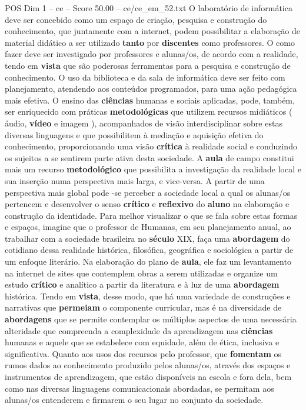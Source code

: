\begin{textsample}{POS Dim 1 – ce – Score 50.00 – ce/ce\_em\_52.txt}
O laboratório de informática deve ser concebido como um espaço de criação, pesquisa e construção do conhecimento, que juntamente com a internet, podem possibilitar a elaboração de material didático a ser utilizado \textbf{tanto} por \textbf{discentes} como professores.
O como fazer deve ser investigado por professores e alunas/os, de acordo com a realidade, tendo em \textbf{vista} que são poderosas ferramentas para a pesquisa e construção de conhecimento.
O uso da biblioteca e da sala de informática deve ser feito com planejamento, atendendo aos conteúdos programados, para uma ação pedagógica mais efetiva.
O ensino das \textbf{ciências} humanas e sociais aplicadas, pode, também, ser enriquecido com práticas \textbf{metodológicas} que utilizem recursos midiáticos ( áudio, \textbf{vídeo} e imagem ), acompanhados de visão interdisciplinar sobre estas diversas linguagens e que possibilitem à mediação e aquisição efetiva do conhecimento, proporcionando uma visão \textbf{crítica} à realidade social e conduzindo os sujeitos a se sentirem parte ativa desta sociedade.
A \textbf{aula} de campo constitui mais um recurso \textbf{metodológico} que possibilita a investigação da realidade local e sua inserção numa perspectiva mais larga, e vice-versa.
A partir de uma perspectiva mais global pode -se perceber a sociedade local a qual os alunas/os pertencem e desenvolver o senso \textbf{crítico} e \textbf{reflexivo} do \textbf{aluno} na elaboração e construção da identidade.
Para melhor visualizar o que se fala sobre estas formas e espaços, imagine que o professor de Humanas, em seu planejamento anual, ao trabalhar com a sociedade brasileira no \textbf{século} XIX, faça uma \textbf{abordagem} do cotidiano dessa realidade histórica, filosófica, geográfica e sociológica a partir de um enfoque literário.
Na elaboração do plano de \textbf{aula}, ele faz um levantamento na internet de sites que contemplem obras a serem utilizadas e organize um estudo \textbf{crítico} e analítico a partir da literatura e à luz de uma \textbf{abordagem} histórica.
Tendo em \textbf{vista}, desse modo, que há uma variedade de construções e narrativas que \textbf{permeiam} o componente curricular, mas é na diversidade de \textbf{abordagens} que se permite contemplar os múltiplos aspectos de uma necessária alteridade que compreenda a complexidade da aprendizagem nas \textbf{ciências} humanas e aquele que se estabelece com equidade, além de ética, inclusiva e significativa.
Quanto aos usos dos recursos pelo professor, que \textbf{fomentam} os rumos dados ao conhecimento produzido pelos alunas/os, através dos espaços e instrumentos de aprendizagem, que estão disponíveis na escola e fora dela, bem como nas diversas linguagens comunicacionais abordadas, se permitam aos alunas/os entenderem e firmarem o seu lugar no conjunto da sociedade.

\end{textsample}
